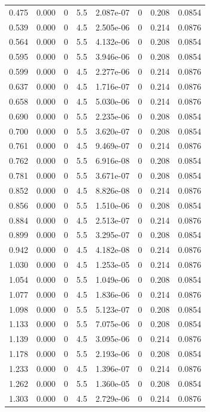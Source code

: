 \documentclass[preview]{standalone}
\begin{document}
{{\begin{tabular}{L{1.2cm}C{1.2cm} C{0.3cm}C{0.5cm} C{1.4cm}C{1.4cm} C{1.4cm}C{1.4cm}}
  0.475  &  0.000  & 0     & 5.5 &  2.087e-07  & 0  & 0.208 &  0.0854   \\ 
  0.539  &  0.000  & 0     & 4.5 &  2.505e-06  & 0  & 0.214 &  0.0876   \\ 
  0.564  &  0.000  & 0     & 5.5 &  4.132e-06  & 0  & 0.208 &  0.0854   \\ 
  0.595  &  0.000  & 0     & 5.5 &  3.946e-06  & 0  & 0.208 &  0.0854   \\ 
  0.599  &  0.000  & 0     & 4.5 &  2.277e-06  & 0  & 0.214 &  0.0876   \\ 
  0.637  &  0.000  & 0     & 4.5 &  1.716e-07  & 0  & 0.214 &  0.0876   \\ 
  0.658  &  0.000  & 0     & 4.5 &  5.030e-06  & 0  & 0.214 &  0.0876   \\ 
  0.690  &  0.000  & 0     & 5.5 &  2.235e-06  & 0  & 0.208 &  0.0854   \\ 
  0.700  &  0.000  & 0     & 5.5 &  3.620e-07  & 0  & 0.208 &  0.0854   \\ 
  0.761  &  0.000  & 0     & 4.5 &  9.469e-07  & 0  & 0.214 &  0.0876   \\ 
  0.762  &  0.000  & 0     & 5.5 &  6.916e-08  & 0  & 0.208 &  0.0854   \\ 
  0.781  &  0.000  & 0     & 5.5 &  3.671e-07  & 0  & 0.208 &  0.0854   \\ 
  0.852  &  0.000  & 0     & 4.5 &  8.826e-08  & 0  & 0.214 &  0.0876   \\ 
  0.856  &  0.000  & 0     & 5.5 &  1.510e-06  & 0  & 0.208 &  0.0854   \\ 
  0.884  &  0.000  & 0     & 4.5 &  2.513e-07  & 0  & 0.214 &  0.0876   \\ 
  0.899  &  0.000  & 0     & 5.5 &  3.295e-07  & 0  & 0.208 &  0.0854   \\ 
  0.942  &  0.000  & 0     & 4.5 &  4.182e-08  & 0  & 0.214 &  0.0876   \\ 
  1.030  &  0.000  & 0     & 4.5 &  1.253e-05  & 0  & 0.214 &  0.0876   \\ 
  1.054  &  0.000  & 0     & 5.5 &  1.049e-06  & 0  & 0.208 &  0.0854   \\ 
  1.077  &  0.000  & 0     & 4.5 &  1.836e-06  & 0  & 0.214 &  0.0876   \\ 
  1.098  &  0.000  & 0     & 5.5 &  5.123e-07  & 0  & 0.208 &  0.0854   \\ 
  1.133  &  0.000  & 0     & 5.5 &  7.075e-06  & 0  & 0.208 &  0.0854   \\ 
  1.139  &  0.000  & 0     & 4.5 &  3.095e-06  & 0  & 0.214 &  0.0876   \\ 
  1.178  &  0.000  & 0     & 5.5 &  2.193e-06  & 0  & 0.208 &  0.0854   \\ 
  1.233  &  0.000  & 0     & 4.5 &  1.396e-07  & 0  & 0.214 &  0.0876   \\ 
  1.262  &  0.000  & 0     & 5.5 &  1.360e-05  & 0  & 0.208 &  0.0854   \\ 
  1.303  &  0.000  & 0     & 4.5 &  2.729e-06  & 0  & 0.214 &  0.0876   \\ 
\hline 
\end{tabular} 

}}
\end{document}
